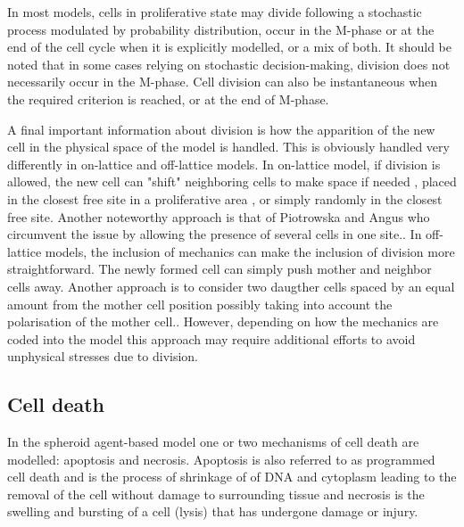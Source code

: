 \documentclass[11pt,a4paper]{article}
\begin{document}
In most models, cells in proliferative state may divide following a stochastic process modulated by probability distribution\cite{Arrebola2020}\cite{Jagiella2016}, occur in the M-phase or at the end of the cell cycle when it is explicitly modelled\cite{Kempf2005}\cite{Hamis2020}\cite{Ghaffarizadeh2017}, or a mix of both.\cite{Tomezak2015}\cite{Cleri2019} It should be noted that in some cases relying on stochastic decision-making, division does not necessarily occur in the M-phase.\cite{Tomezak2015}\cite{Cleri2019}\cite{Jagiella2016} Cell division can also be instantaneous when the required criterion is reached\cite{Mao2018}\cite{Bull2020}, or at the end of M-phase.\cite{Hamis2020}

A final important information about division is how the apparition of the new cell in the physical space of the model is handled. This is obviously handled very differently in on-lattice and off-lattice models. In on-lattice model, if division is allowed, the new cell can "shift" neighboring cells to make space if needed \cite{Mao2018}\cite{Tomezak2015}\cite{Cleri2019}, placed in the closest free site in a proliferative area \cite{Arrebola2020}, or simply randomly in the closest free site\cite{Hamis2020}\cite{Jagiella2016}. Another noteworthy approach is that of Piotrowska and Angus who circumvent the issue by allowing the presence of several cells in one site.\cite{Piotrowska2009}. In off-lattice models, the inclusion of mechanics can make the inclusion of division more straightforward. The newly formed cell can simply push mother and neighbor cells away.\cite{Bull2020} Another approach is to consider two daugther cells spaced by an equal amount from the mother cell position\cite{Kempf2005} possibly taking into account the polarisation of the mother cell.\cite{Ghaffarizadeh2017}. However, depending on how the mechanics are coded into the model this approach may require additional efforts to avoid unphysical stresses due to division.\cite{Kempf2005}\cite{Kempf2010}


\subsection{Cell death}
In the spheroid agent-based model one or two mechanisms of cell death are modelled: apoptosis and necrosis. Apoptosis is also referred to as programmed cell death and is the process of shrinkage of of DNA and cytoplasm leading to the removal of the cell without damage to surrounding tissue and necrosis is the swelling and bursting of a cell (lysis) that has undergone damage or injury.\cite{Alberts2002}
\end{document}
